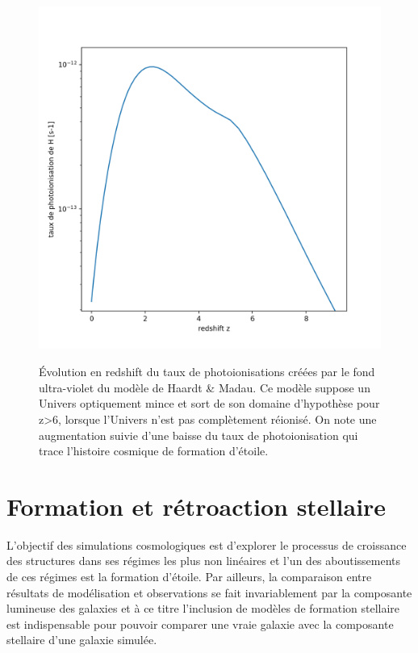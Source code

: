 \begin{figure}[htbp]
	\centering
		\includegraphics[height=12cm]{figs/HM.png}
	\caption[modèle de Haardt \& Madau]{Évolution en redshift du taux de photoionisations créées par le fond ultra-violet du modèle de Haardt \& Madau. Ce modèle suppose un Univers optiquement mince et sort de son domaine d'hypothèse pour z>6, lorsque l'Univers n'est pas complètement réionisé. On note une augmentation suivie d'une baisse du taux de photoionisation qui trace l'histoire cosmique de formation d'étoile.}
	\label{f:HM}
\end{figure}


\section{Formation et rétroaction stellaire}
L'objectif des simulations cosmologiques est d'explorer le processus de croissance des structures dans ses régimes les plus non linéaires et l'un des aboutissements de ces régimes est la formation d'étoile. Par ailleurs, la comparaison entre résultats de modélisation et observations se fait invariablement par la composante lumineuse des galaxies et à ce titre l'inclusion de modèles de formation stellaire est indispensable pour pouvoir comparer une vraie galaxie avec la composante stellaire d'une galaxie simulée.

